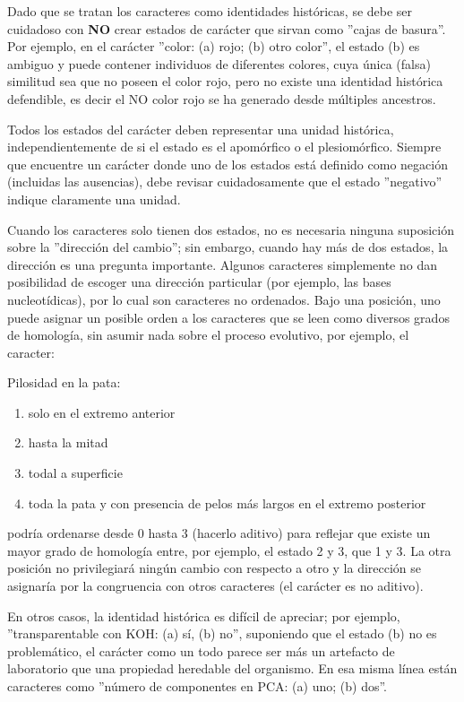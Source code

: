 Dado que se tratan los caracteres como identidades hist\'oricas, se debe ser cuidadoso con \textbf{NO} crear estados de car\'acter que sirvan como ''cajas de basura''. Por ejemplo, en el car\'acter ''color: (a) rojo; (b) otro color'', el estado (b) es ambiguo y puede contener individuos de diferentes colores, cuya \'unica (falsa) similitud sea que no poseen el color rojo, pero no existe una identidad hist\'orica defendible, es decir el NO color rojo se ha generado desde m\'ultiples ancestros.


Todos los estados del car\'acter deben representar una unidad hist\'orica, independientemente de si el estado es el apom\'orfico o el 
plesiom\'orfico. 
Siempre que encuentre un car\'acter donde uno de los estados est\'a definido como negaci\'on (incluidas las ausencias), 
debe revisar cuidadosamente que el estado ''negativo'' indique claramente una unidad.


Cuando los caracteres solo tienen dos estados, no es necesaria ninguna suposici\'on sobre la ''direcci\'on del cambio''; 
sin embargo, cuando hay m\'as de dos estados, la direcci\'on es una pregunta importante. 
Algunos caracteres simplemente no dan posibilidad de escoger una direcci\'on particular (por ejemplo, las bases nucleot\'idicas), 
por lo cual son caracteres no ordenados. 
Bajo una posici\'on,  uno puede asignar un posible orden a los caracteres que se leen como diversos grados de homolog\'ia, 
sin asumir nada sobre el proceso evolutivo, 
por ejemplo, el caracter: 


\begin{small}
Pilosidad en la pata: 
\begin{enumerate}[start=0]
\item solo en el extremo anterior
\item hasta la mitad
\item todal a superficie
\item toda la pata y con presencia de pelos m\'as largos en el extremo posterior
\end{enumerate}	
\end{small}


podr\'ia ordenarse desde 0 hasta 3 (hacerlo aditivo) para reflejar que existe un mayor grado de homolog\'ia entre, por ejemplo, el estado 2 y 3, que 1 y 3. 
La otra posici\'on no privilegiar\'a ning\'un cambio con respecto a otro y la direcci\'on se asignar\'ia por la congruencia con otros caracteres (el car\'acter es no aditivo).


En otros casos, la identidad hist\'orica es dif\'icil de apreciar; por ejemplo, ''transparentable con KOH: (a) s\'i, (b) no'', suponiendo que el estado (b) no es problem\'atico, el car\'acter como un todo parece ser m\'as un artefacto de laboratorio que una propiedad heredable del organismo. En esa misma l\'inea est\'an caracteres como ''n\'umero de componentes en PCA: (a) uno; (b) dos''.



